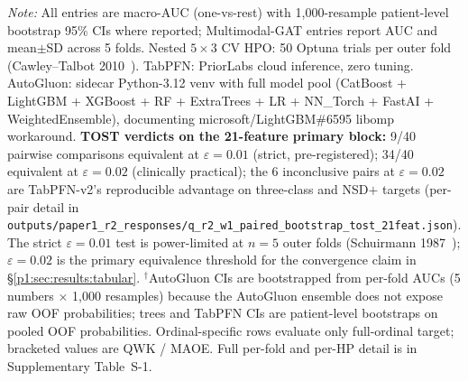 \begin{table}[!t]
\raggedright\scriptsize\textit{Note:} All entries are macro-AUC (one-vs-rest) with 1,000-resample patient-level bootstrap 95\% CIs where reported; Multimodal-GAT entries report AUC and mean$\pm$SD across 5 folds. Nested $5{\times}3$ CV HPO: 50 Optuna trials per outer fold (Cawley--Talbot 2010~\cite{cawleytalbot2010}). TabPFN: PriorLabs cloud inference, zero tuning. AutoGluon: sidecar Python-3.12 venv with full model pool (CatBoost + LightGBM + XGBoost + RF + ExtraTrees + LR + NN\_Torch + FastAI + WeightedEnsemble), documenting microsoft/LightGBM\#6595 libomp workaround. \textbf{TOST verdicts on the 21-feature primary block:} 9/40 pairwise comparisons equivalent at $\varepsilon{=}0.01$ (strict, pre-registered); 34/40 equivalent at $\varepsilon{=}0.02$ (clinically practical); the 6 inconclusive pairs at $\varepsilon{=}0.02$ are TabPFN-v2's reproducible advantage on three-class and NSD$+$ targets (per-pair detail in \texttt{outputs/paper1\_r2\_responses/q\_r2\_w1\_paired\_bootstrap\_tost\_21feat.json}). The strict $\varepsilon{=}0.01$ test is power-limited at $n{=}5$ outer folds (Schuirmann 1987~\cite{schuirmann1987}); $\varepsilon{=}0.02$ is the primary equivalence threshold for the convergence claim in \S\ref{p1:sec:results:tabular}. $^{\dagger}$AutoGluon CIs are bootstrapped from per-fold AUCs (5 numbers $\times$ 1{,}000 resamples) because the AutoGluon ensemble does not expose raw OOF probabilities; trees and TabPFN CIs are patient-level bootstraps on pooled OOF probabilities. Ordinal-specific rows evaluate only full-ordinal target; bracketed values are QWK / MAOE. Full per-fold and per-HP detail is in Supplementary Table~S-1.
\end{table}

